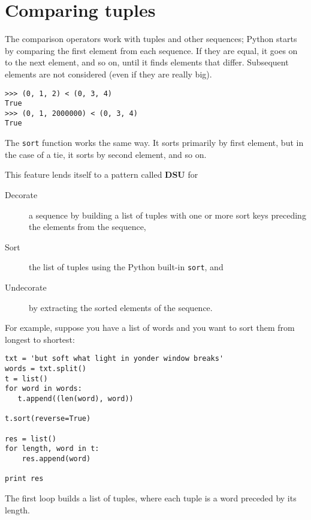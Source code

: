 \section{Comparing tuples}


The comparison operators work with tuples and other sequences;
Python starts by comparing the first element from each
sequence.  If they are equal, it goes on to the next element,
and so on, until it finds elements that differ.  Subsequent
elements are not considered (even if they are really big).

\beforeverb
\begin{verbatim}
>>> (0, 1, 2) < (0, 3, 4)
True
>>> (0, 1, 2000000) < (0, 3, 4)
True
\end{verbatim}
\afterverb
%
The {\tt sort} function works the same way.  It sorts 
primarily by first element, but in the case of a tie, it sorts
by second element, and so on.  

This feature lends itself to a pattern called {\bf DSU} for 

\begin{description}

\item[Decorate] a sequence by building a list of tuples
with one or more sort keys preceding the elements from the sequence,

\item[Sort] the list of tuples using the Python built-in {\tt sort}, and

\item[Undecorate] by extracting the sorted elements of the sequence.

\end{description}

\label{DSU}

For example, suppose you have a list of words and you want to
sort them from longest to shortest:

\beforeverb
\begin{verbatim}
txt = 'but soft what light in yonder window breaks'
words = txt.split()
t = list()
for word in words:
   t.append((len(word), word))

t.sort(reverse=True)

res = list()
for length, word in t:
    res.append(word)

print res
\end{verbatim}
\afterverb
%
The first loop builds a list of tuples, where each
tuple is a word preceded by its length.


